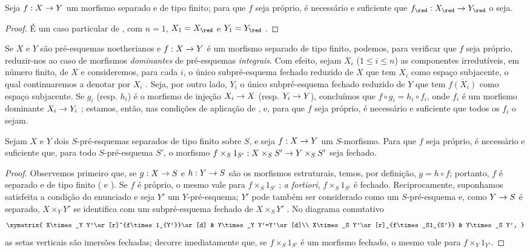 \documentclass[oneside,10pt]{amsart}
\makeatletter
\renewcommand{\leq}{\leqslant}
\newcommand{\ega@arrow}[2]{\mathchoice{#1}{#2}{#2}{#2}}
\renewcommand{\to}{\ega@arrow{\longrightarrow}{\rightarrow}}
\let\EGAOriginalLabel\label
\renewcommand{\label}[1]{\phantomsection\EGAOriginalLabel{#1}}
\makeatother
\begin{document}
\begin{corollary}[5.4.6]
\label{II.5.4.6}
Seja $f:X\to Y$ um morfismo separado e de tipo finito; para que $f$ seja próprio, é necessário e suficiente que $f_\red:X_\red\to Y_\red$ o seja.
\end{corollary}

\begin{proof}
É um caso particular de , com $n=1$, $X_1=X_\red$ e $Y_1=Y_\red$ .
\end{proof}

\begin{env}[5.4.7]
\label{II.5.4.7}
Se $X$ e $Y$ são pré-esquemas noetherianos e $f:X\to Y$ é um morfismo separado de tipo finito, podemos, para verificar que $f$ seja próprio, reduzir-nos ao caso de morfismos \emph{dominantes} de pré-esquemas \emph{integrais}.
Com efeito, sejam $X_i$ ($1\leq i\leq n$) as componentes irredutíveis, em número finito, de $X$ e consideremos, para cada $i$, o único subpré-esquema fechado reduzido de $X$ que tem $X_i$ como espaço subjacente, o qual continuaremos a denotar por $X_i$ .
Seja, por outro lado, $Y_i$ o único subpré-esquema fechado reduzido de $Y$ que tem $\overline{f(X_i)}$ como espaço subjacente.
Se $g_i$ (resp. $h_i$) é o morfismo de injeção $X_i\to X$ (resp. $Y_i\to Y$), concluímos que $f\circ g_i=h_i\circ f_i$, onde $f_i$ é um morfismo dominante $X_i\to Y_i$ ;
estamos, então, nas condições de aplicação de , e, para que $f$ seja próprio, é necessário e suficiente que todos os $f_i$ o sejam.
\end{env}

\begin{corollary}[5.4.8]
\label{II.5.4.8}
Sejam $X$ e $Y$ dois $S$-pré-esquemas separados de tipo finito sobre $S$, e seja $f:X\to Y$ um $S$-morfismo.
Para que $f$ seja próprio, é necessário e suficiente que, para todo $S$-pré-esquema $S'$, o morfismo $f\times_S 1_{S'}:X\times_S S'\to Y\times_S S'$ seja fechado.
\end{corollary}

\begin{proof}
Observemos primeiro que, se $g:X\to S$ e $h:Y\to S$ são os morfismos estruturais, temos, por definição, $g=h\circ f$; portanto, $f$ é separado e de tipo finito ( e ).
Se $f$ é próprio, o mesmo vale para $f\times_S 1_{S'}$ ; \emph{a fortiori}, $f\times_S 1_{S'}$ é fechado.
Reciprocamente, suponhamos satisfeita a condição do enunciado e seja $Y'$ um $Y$-pré-esquema;
$Y'$ pode também ser considerado como um $S$-pré-esquema e, como $Y\to S$ é separado, $X\times_Y Y'$ se identifica com um subpré-esquema fechado de $X\times_S Y'$ .
No diagrama comutativo
\[
  \xymatrix{
    X\times_Y Y'\ar[r]^{f\times1_{Y'}}\ar[d] &
    Y\times_Y Y'=Y'\ar[d]\\
    X\times_S Y'\ar[r]_{f\times_S1_{S'}} &
    Y\times_S Y',
  }
\]
as setas verticais são imersões fechadas; decorre imediatamente que, se $f\times_S1_{S'}$ é um morfismo fechado, o mesmo vale para $f\times_Y1_{Y'}$.
\end{proof}
\end{document}

